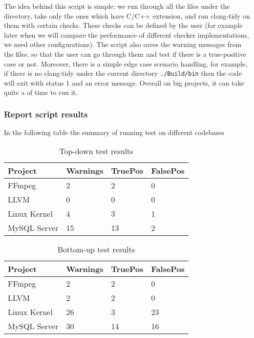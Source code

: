 The idea behind this script is simple: we run through all the files under the directory, take only the ones which have C/C++ extension, and run clang-tidy on them with certain checks. These checks can be defined by the user (for example later when we will compare the performance of different checker implementations, we need other configurations). The script also saves the warning messages from the files, so that the user can go through them and test if there is a true-positive case or not. Moreover, there is a simple edge case scenario handling, for example, if there is no clang-tidy under the current directory \lstinline{./Build/bin} then the code will exit with status 1 and an error message. Overall on big projects, it can take quite a of time to run it. 

\subsubsection{Report script results}

In the following table the summary of running test on different codebases

\begin{table}[H]
    \centering
    \begin{tabular}{|m{}|m{}|m{}|m{}|}
        \hline
        \textbf{Project} & \textbf{Warnings} & \textbf{TruePos} & \textbf{FalsePos}  \\
        \hline
        FFmpeg & 2 & 2 & 0 \\
        \hline
        LLVM & 0 & 0 & 0 \\
        \hline
        Linux Kernel & 4 & 3 & 1 \\
        \hline 
        MySQL Server & 15 & 13 & 2 \\
        \hline
    \end{tabular}
    \caption{Top-down test results}
    \label{tab:test-td-codebases}
\end{table}

\begin{table}[H]
    \centering
    \begin{tabular}{|m{}|m{}|m{}|m{}|}
        \hline
        \textbf{Project} & \textbf{Warnings} & \textbf{TruePos} & \textbf{FalsePos}  \\
        \hline
        FFmpeg & 2 & 2 & 0 \\
        \hline
        LLVM & 2 & 2 & 0 \\
        \hline
        Linux Kernel & 26 & 3 & 23 \\
        \hline 
        MySQL Server & 30 & 14 & 16 \\
        \hline
    \end{tabular}
    \caption{Bottom-up test results}
    \label{tab:test-bu-codebases}
\end{table}



